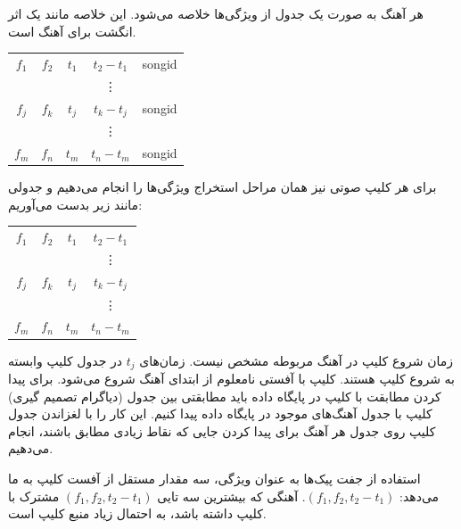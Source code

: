 \documentclass{utsignal}
\begin{document}
	هر آهنگ به صورت یک جدول از ویژگی‌ها خلاصه می‌شود. این خلاصه مانند یک اثر انگشت برای آهنگ است.
	\begin{center}
		\begin{latin}
			\begin{tabular}{|c|c|c|c|c|}
				$f_1$ & $f_2$ & $t_1$ & $t_2-t_1$ & songid\\
				&&&\vdots&\\
				$f_j$ & $f_k$ & $t_j$ & $t_k-t_j$ & songid\\
				&&&\vdots&\\
				$f_m$ & $f_n$ & $t_m$ & $t_n-t_m$ & songid\\
			\end{tabular}
		\end{latin}
	\end{center}
	برای هر کلیپ صوتی نیز همان مراحل استخراج ویژگی‌ها را انجام می‌دهیم و جدولی مانند زیر بدست می‌آوریم:
	\begin{center}
		\begin{latin}
			\begin{tabular}{|c|c|c|c|}
				$f_1$ & $f_2$ & $t_1$ & $t_2-t_1$\\
				&&&\vdots\\
				$f_j$ & $f_k$ & $t_j$ & $t_k-t_j$\\
				&&&\vdots\\
				$f_m$ & $f_n$ & $t_m$ & $t_n-t_m$\\
			\end{tabular}
		\end{latin}
	\end{center}
	
	زمان شروع کلیپ در آهنگ مربوطه مشخص نیست. زمان‌های $t_j$ در جدول کلیپ وابسته به شروع کلیپ هستند. کلیپ با آفستی نامعلوم از ابتدای آهنگ شروع می‌شود. برای پیدا کردن مطابقت با کلیپ در پایگاه داده باید مطابقتی بین جدول (دیاگرام تصمیم گیری) کلیپ با جدول آهنگ‌های موجود در پایگاه داده پیدا کنیم. این کار را با لغزاندن جدول کلیپ روی جدول هر آهنگ برای پیدا کردن جایی که نقاط زیادی مطابق باشند، انجام می‌دهیم.
	
	استفاده از جفت پیک‌ها به عنوان ویژگی، سه مقدار مستقل از آفست کلیپ به ما می‌دهد: $(f_1, f_2, t_2-t_1)$. آهنگی که بیشترین سه تایی $(f_1, f_2, t_2 - t_1)$ مشترک با کلیپ داشته باشد، به احتمال زیاد منبع کلیپ است.
\end{document}
